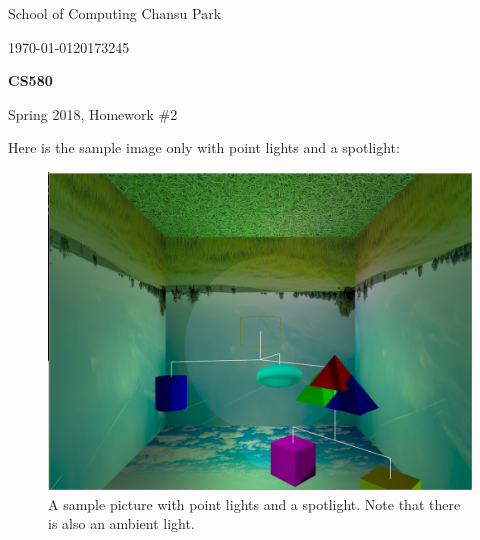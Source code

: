 \documentclass[11pt]{article}
\begin{document}
 



{\large
\noindent School of Computing %
\hfill Chansu Park %

\vspace{.1in}

\noindent \today \hfill 20173245}

\vspace{.25in}

\Large{
\begin{center}
\textbf{CS580}

Spring 2018, Homework \#2
\end{center}
}

\large

Here is the sample image only with point lights and a spotlight:
\begin{figure}[htb]
	\begin{center}
		\includegraphics[width=0.8\linewidth]{pointSpot.png}
	\end{center}
	\caption{A sample picture with point lights and a spotlight. Note that there is also an ambient light.}
\end{figure}
\end{document}
